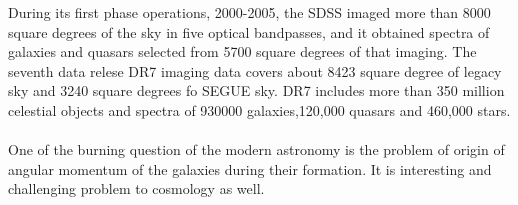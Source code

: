 \noindent During its first phase operations, 2000-2005, the SDSS imaged more than 8000 square degrees of the sky in five optical bandpasses, and it obtained spectra of galaxies and quasars selected from 5700 square degrees of that imaging. The seventh data relese DR7 imaging data covers about 8423 square degree of  legacy sky and 3240 square degrees fo SEGUE sky. DR7 includes more than 350 million celestial objects and spectra of 930000 galaxies,120,000 quasars and 460,000 stars.\\\\
One of the burning question of the modern astronomy is the problem of origin of angular momentum of the galaxies during their formation. It is interesting and challenging problem to cosmology as well.
%
%
%
%
